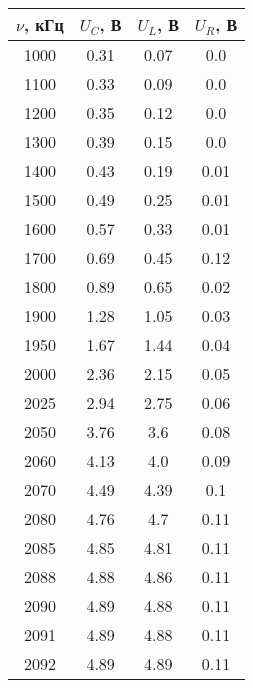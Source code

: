 \documentclass[a4paper, usenames, dvipsnames]{article}
\begin{document}
\begin{table}[p]
    \centering
    \begin{tabular}{|c|c|c|c|}
        \hline
        $\nu$, кГц & $U_C$, В & $U_L$, В & $U_R$, В \\
        \hline
        1000       & 0.31     & 0.07     & 0.0      \\
        \hline
        1100       & 0.33     & 0.09     & 0.0      \\
        \hline
        1200       & 0.35     & 0.12     & 0.0      \\
        \hline
        1300       & 0.39     & 0.15     & 0.0      \\
        \hline
        1400       & 0.43     & 0.19     & 0.01     \\
        \hline
        1500       & 0.49     & 0.25     & 0.01     \\
        \hline
        1600       & 0.57     & 0.33     & 0.01     \\
        \hline
        1700       & 0.69     & 0.45     & 0.12     \\
        \hline
        1800       & 0.89     & 0.65     & 0.02     \\
        \hline
        1900       & 1.28     & 1.05     & 0.03     \\
        \hline
        1950       & 1.67     & 1.44     & 0.04     \\
        \hline
        2000       & 2.36     & 2.15     & 0.05     \\
        \hline
        2025       & 2.94     & 2.75     & 0.06     \\
        \hline
        2050       & 3.76     & 3.6      & 0.08     \\
        \hline
        2060       & 4.13     & 4.0      & 0.09     \\
        \hline
        2070       & 4.49     & 4.39     & 0.1      \\
        \hline
        2080       & 4.76     & 4.7      & 0.11     \\
        \hline
        2085       & 4.85     & 4.81     & 0.11     \\
        \hline
        2088       & 4.88     & 4.86     & 0.11     \\
        \hline
        2090       & 4.89     & 4.88     & 0.11     \\
        \hline
        2091       & 4.89     & 4.88     & 0.11     \\
        \hline
        2092       & 4.89     & 4.89     & 0.11     \\

\end{tabular}
\end{table}
\end{document}
